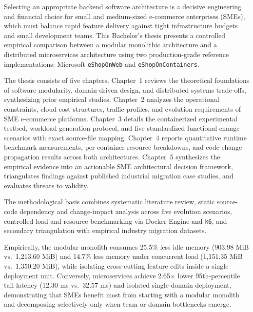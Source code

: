 \frontmatterpage
{}

Selecting an appropriate backend software architecture is a decisive engineering and financial choice for small and medium-sized e-commerce enterprises (SMEs), which must balance rapid feature delivery against tight infrastructure budgets and small development teams. This Bachelor's thesis presents a controlled empirical comparison between a modular monolithic architecture and a distributed microservices architecture using two production-grade reference implementations: Microsoft \texttt{eShopOnWeb} and \texttt{eShopOnContainers}.

The thesis consists of five chapters. Chapter~1 reviews the theoretical foundations of software modularity, domain-driven design, and distributed systems trade-offs, synthesizing prior empirical studies. Chapter~2 analyzes the operational constraints, cloud cost structures, traffic profiles, and evolution requirements of SME e-commerce platforms. Chapter~3 details the containerized experimental testbed, workload generation protocol, and five standardized functional change scenarios with exact source-file mapping. Chapter~4 reports quantitative runtime benchmark measurements, per-container resource breakdowns, and code-change propagation results across both architectures. Chapter~5 synthesizes the empirical evidence into an actionable SME architectural decision framework, triangulates findings against published industrial migration case studies, and evaluates threats to validity.

The methodological basis combines systematic literature review, static source-code dependency and change-impact analysis across five evolution scenarios, controlled load and resource benchmarking via Docker Engine and \texttt{k6}, and secondary triangulation with empirical industry migration datasets.

Empirically, the modular monolith consumes 25.5\% less idle memory (903.98 MiB vs.\ 1,213.60 MiB) and 14.7\% less memory under concurrent load (1,151.35 MiB vs.\ 1,350.20 MiB), while isolating cross-cutting feature edits inside a single deployment unit. Conversely, microservices achieve 2.65$\times$ lower 95th-percentile tail latency (12.30 ms vs.\ 32.57 ms) and isolated single-domain deployment, demonstrating that SMEs benefit most from starting with a modular monolith and decomposing selectively only when team or domain bottlenecks emerge.

\thesisscopeEN
